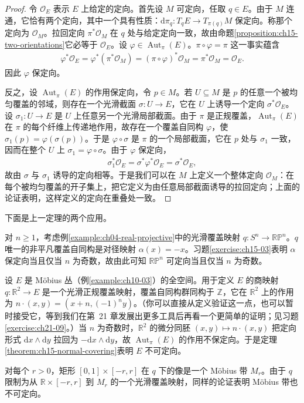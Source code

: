 \documentclass[../../main.tex]{subfiles}
\begin{document}
\begin{proof}
令 $\mathcal O_E$ 表示 $E$ 上给定的定向。首先设 $M$ 可定向，任取 $q\in E$。由于 $M$ 连通，它恰有两个定向，其中一个具有性质：$\mathrm{d}\pi_q:T_qE\to T_{\pi(q)}M$ 保定向。称那个定向为 $\mathcal O_M$。拉回定向 $\pi^*\mathcal O_M$ 在 $q$ 处与给定定向一致，故由命题\ref{proposition:ch15-two-orientations}它必等于 $\mathcal O_E$。设 $\varphi\in\operatorname{Aut}_\pi(E)$。$\pi\circ\varphi=\pi$ 这一事实蕴含
\begin{align*}
\varphi^*\mathcal O_E=\varphi^*(\pi^*\mathcal O_M)=(\pi\circ\varphi)^*\mathcal O_M=\pi^*\mathcal O_M=\mathcal O_E.
\end{align*}
因此 $\varphi$ 保定向。

反之，设 $\operatorname{Aut}_\pi(E)$ 的作用保定向，令 $p\in M$。若 $U\subseteq M$ 是 $p$ 的任意一个被均匀覆盖的邻域，则存在一个光滑截面 $\sigma:U\to E$，它在 $U$ 上诱导一个定向 $\sigma^*\mathcal O_E$。设 $\sigma_1:U\to E$ 是 $U$ 上任意另一个光滑局部截面。由于 $\pi$ 是正规覆盖，$\operatorname{Aut}_\pi(E)$ 在 $\pi$ 的每个纤维上传递地作用，故存在一个覆盖自同构 $\varphi$，使 $\sigma_1(p)=\varphi(\sigma(p))$。于是 $\varphi\circ\sigma$ 是 $\pi$ 的一个局部截面，它在 $p$ 处与 $\sigma_1$ 一致，因而在整个 $U$ 上 $\sigma_1=\varphi\circ\sigma$。由于 $\varphi$ 保定向，
\begin{align*}
\sigma_1^*\mathcal O_E=\sigma^*\varphi^*\mathcal O_E=\sigma^*\mathcal O_E,
\end{align*}
故由 $\sigma$ 与 $\sigma_1$ 诱导的定向相等。于是我们可以在 $M$ 上定义一个整体定向 $\mathcal O_M$：在每个被均匀覆盖的开子集上，把它定义为由任意局部截面诱导的拉回定向；上面的论证表明，这样定义的定向在重叠处一致。
\end{proof}

下面是上一定理的两个应用。

\begin{example}[射影空间的可定向性]\label{example:ch15-rp-orientable}
对 $n\geqslant1$，考虑例\ref{example:ch04-real-projective}中的光滑覆盖映射 $q:S^n\to\mathbb{RP}^n$。$q$ 唯一的非平凡覆盖自同构是对径映射 $\alpha(x)=-x$。习题\ref{exercise:ch15-03}表明 $\alpha$ 保定向当且仅当 $n$ 为奇数，故由此可知 $\mathbb{RP}^n$ 可定向当且仅当 $n$ 为奇数。
\end{example}

\begin{example}\label{example:ch15-mobius-bundle}
设 $E$ 是 Möbius 丛（例\ref{example:ch10-03}）的全空间。用于定义 $E$ 的商映射 $q:\mathbb{R}^2\to E$ 是一个光滑正规覆盖映射，覆盖自同构群同构于 $\mathbb{Z}$，它在 $\mathbb{R}^2$ 上的作用为 $n\cdot(x,y)=(x+n,(-1)^n y)$。（你可以直接从定义验证这一点，也可以暂时接受它，等到我们在第~21 章发展出更多工具后再看一个更简单的证明；见习题\ref{exercise:ch21-09}。）当 $n$ 为奇数时，$\mathbb{R}^2$ 的微分同胚 $(x,y)\mapsto n\cdot(x,y)$ 把定向形式 $\mathrm{d}x\wedge\mathrm{d}y$ 拉回为 $-\mathrm{d}x\wedge\mathrm{d}y$，故 $\operatorname{Aut}_\pi(E)$ 的作用不保定向。于是定理\ref{theorem:ch15-normal-covering}表明 $E$ 不可定向。

对每个 $r>0$，矩形 $[0,1]\times[-r,r]$ 在 $q$ 下的像是一个 Möbius 带 $M_r$。由于 $q$ 限制为从 $\mathbb{R}\times[-r,r]$ 到 $M_r$ 的一个光滑覆盖映射，同样的论证表明 Möbius 带也不可定向。
\end{example}
\end{document}
